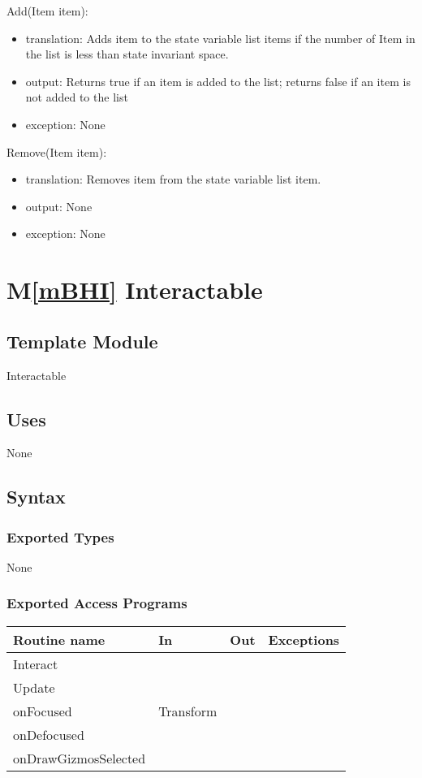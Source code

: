 \documentclass[12pt]{article}
\newcommand{\mref}[1]{M\ref{#1}}
\begin{document}
\noindent Add(Item item):
\begin{itemize}
\item translation: Adds item to the state variable list items if the number of Item in the list is less than state invariant space.
\item output: Returns true if an item is added to the list; returns false if an item is not added to the list
\item exception: None
\end{itemize}

\noindent Remove(Item item):
\begin{itemize}
\item translation: Removes item from the state variable list item.
\item output: None
\item exception: None
\end{itemize}

\newpage

\section* {\mref{mBHI} Interactable}

\subsection*{Template Module}

Interactable

\subsection* {Uses}

None

\subsection* {Syntax}

\subsubsection* {Exported Types}

None

\subsubsection* {Exported Access Programs}

\begin{tabular}{| l | l | l | l |}
\hline
\textbf{Routine name} & \textbf{In} & \textbf{Out} & \textbf{Exceptions}\\
\hline
Interact & ~ & ~  & ~\\
Update & ~ & ~ & ~\\
onFocused & Transform & ~  & ~\\
onDefocused & ~ & ~  & ~\\
onDrawGizmosSelected & ~ & ~  & ~\\
\hline
\end{tabular}
\end{document}
